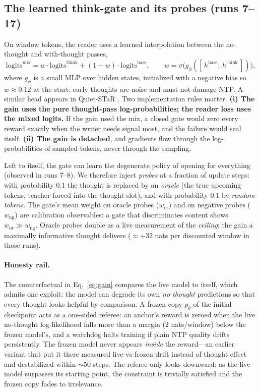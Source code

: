 \documentclass{article} %
\newcommand{\frozen}{p_{\bar\theta}}
\begin{document}
\subsection{The learned think-gate and its probes (runs 7--17)}
\label{sec:gate-old}
\label{sec:gate}

On window tokens, the reader uses a learned interpolation between the no-thought and with-thought passes,
\begin{equation}
    \mathrm{logits}^{\mathrm{mix}} = w \cdot \mathrm{logits}^{\mathrm{think}} + (1 - w)\cdot \mathrm{logits}^{\mathrm{base}},
    \qquad
    w = \sigma\big( g_\phi([\,h^{\mathrm{base}} ;\, h^{\mathrm{think}}\,]) \big),
\end{equation}
where $g_\phi$ is a small MLP over hidden states, initialized with a negative bias so $w \approx 0.12$ at the start: early thoughts are noise and must not damage NTP. A similar head appears in Quiet-STaR \citep{zelikman2024quietstar}. Two implementation rules matter. \textbf{(i) The gain uses the pure thought-pass log-probabilities; the reader loss uses the mixed logits.} If the gain used the mix, a closed gate would zero every reward exactly when the writer needs signal most, and the failure would seal itself. \textbf{(ii) The gain is detached}, and gradients flow through the log-probabilities of sampled tokens, never through the sampling.

Left to itself, the gate can learn the degenerate policy of opening for everything (observed in runs 7--8). We therefore inject \emph{probes} at a fraction of update steps: with probability $0.1$ the thought is replaced by an \emph{oracle} (the true upcoming tokens, teacher-forced into the thought slot), and with probability $0.1$ by \emph{random tokens}. The gate's mean weight on oracle probes ($w_{\mathrm{or}}$) and on negative probes ($w_{\mathrm{ng}}$) are calibration observables: a gate that discriminates content shows $w_{\mathrm{or}} \gg w_{\mathrm{ng}}$. Oracle probes double as a live measurement of the \emph{ceiling}: the gain a maximally informative thought delivers (${\approx}{+}32$ nats per discounted window in those runs).

\paragraph{Honesty rail.} The counterfactual in Eq.~\eqref{eq:gain} compares the live model to itself, which admits one exploit: the model can degrade its own \emph{no-thought} predictions so that every thought looks helpful by comparison. A frozen copy $\frozen$ of the initial checkpoint acts as a one-sided referee: an anchor's reward is zeroed when the live no-thought log-likelihood falls more than a margin ($2$ nats/window) below the frozen model's, and a watchdog halts training if plain NTP quality drifts persistently. The frozen model never appears \emph{inside} the reward---an earlier variant that put it there measured live-vs-frozen drift instead of thought effect and destabilized within ${\sim}50$ steps. The referee only looks downward: as the live model surpasses its starting point, the constraint is trivially satisfied and the frozen copy fades to irrelevance.
\end{document}
